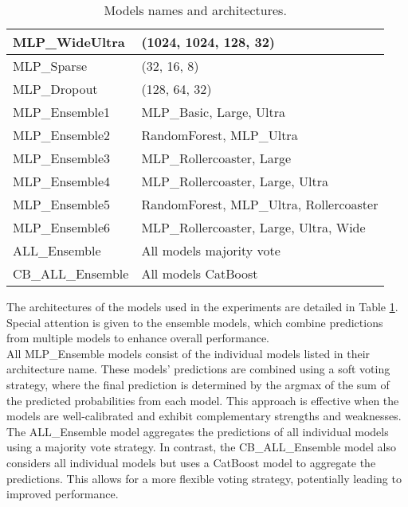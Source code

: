 \begin{table}[ht!]
\begin{tabular}{|l|l|}
        MLP\_WideUltra          & (1024, 1024, 128, 32)                                 \\ \hline
        MLP\_Sparse             & (32, 16, 8)                                           \\ \hline
        MLP\_Dropout            & (128, 64, 32)                                         \\ \hline
        MLP\_Ensemble1          & MLP\_Basic, Large, Ultra                    \\ \hline
        MLP\_Ensemble2          & RandomForest, MLP\_Ultra                              \\ \hline
        MLP\_Ensemble3          & MLP\_Rollercoaster, Large                        \\ \hline
        MLP\_Ensemble4          & MLP\_Rollercoaster, Large, Ultra            \\ \hline
        MLP\_Ensemble5          & RandomForest, MLP\_Ultra, Rollercoaster          \\ \hline
        MLP\_Ensemble6          & MLP\_Rollercoaster, Large, Ultra, Wide \\ \hline
        ALL\_Ensemble           & All models majority vote                              \\ \hline
        CB\_ALL\_Ensemble       & All models CatBoost                                   \\ \hline
    \end{tabular}
    \caption{Models names and architectures.}
    \label{tab:models}
\end{table}

The architectures of the models used in the experiments are detailed in Table \ref{tab:models}. 
Special attention is given to the ensemble models, which combine predictions from multiple models 
to enhance overall performance.\\
\noindent
All MLP\_Ensemble models consist of the individual models listed in their architecture name. 
These models’ predictions are combined using a soft voting strategy, where the final prediction is 
determined by the argmax of the sum of the predicted probabilities from each model. This approach is 
effective when the models are well-calibrated and exhibit complementary strengths and weaknesses.\\
\noindent
The ALL\_Ensemble model aggregates the predictions of all individual models using a majority vote strategy. 
In contrast, the CB\_ALL\_Ensemble model also considers all individual models but uses a CatBoost model to 
aggregate the predictions. This allows for a more flexible voting strategy, potentially leading to improved 
performance.